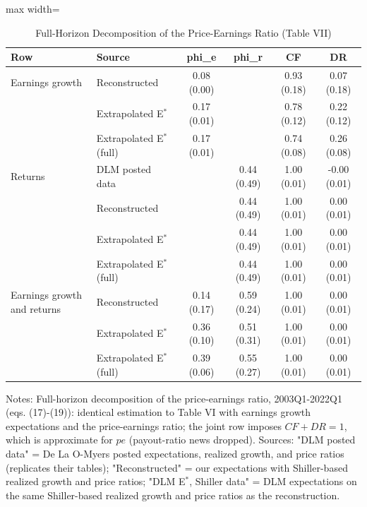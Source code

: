 \documentclass[11pt]{article}
\begin{document}
\begin{table}[H]
\centering
\caption{Full-Horizon Decomposition of the Price-Earnings Ratio (Table VII)}
\label{tab:t7}
\small
\begin{adjustbox}{max width=\textwidth}
\begin{tabular}{llcccc}
\toprule
Row & Source & phi\_e & phi\_r & CF & DR \\
\midrule
Earnings growth & Reconstructed & 0.08 (0.00) &  & 0.93 (0.18) & 0.07 (0.18) \\
 & Extrapolated E$^*$ & 0.17 (0.01) &  & 0.78 (0.12) & 0.22 (0.12) \\
 & Extrapolated E$^*$ (full) & 0.17 (0.01) &  & 0.74 (0.08) & 0.26 (0.08) \\
\addlinespace
Returns & DLM posted data &  & 0.44 (0.49) & 1.00 (0.01) & -0.00 (0.01) \\
 & Reconstructed &  & 0.44 (0.49) & 1.00 (0.01) & 0.00 (0.01) \\
 & Extrapolated E$^*$ &  & 0.44 (0.49) & 1.00 (0.01) & 0.00 (0.01) \\
 & Extrapolated E$^*$ (full) &  & 0.44 (0.49) & 1.00 (0.01) & 0.00 (0.01) \\
\addlinespace
Earnings growth and returns & Reconstructed & 0.14 (0.17) & 0.59 (0.24) & 1.00 (0.01) & 0.00 (0.01) \\
 & Extrapolated E$^*$ & 0.36 (0.10) & 0.51 (0.31) & 1.00 (0.01) & 0.00 (0.01) \\
 & Extrapolated E$^*$ (full) & 0.39 (0.06) & 0.55 (0.27) & 1.00 (0.01) & 0.00 (0.01) \\
\bottomrule
\end{tabular}
\end{adjustbox}

\vspace{2pt}
{\footnotesize Notes: Full-horizon decomposition of the price-earnings ratio, 2003Q1-2022Q1 (eqs. (17)-(19)): identical estimation to Table VI with earnings growth expectations and the price-earnings ratio; the joint row imposes $CF + DR = 1$, which is approximate for $pe$ (payout-ratio news dropped). Sources: "DLM posted data" = De La O-Myers posted expectations, realized growth, and price ratios (replicates their tables); "Reconstructed" = our expectations with Shiller-based realized growth and price ratios; "DLM E$^*$, Shiller data" = DLM expectations on the same Shiller-based realized growth and price ratios as the reconstruction. }
\end{table}
\end{document}
